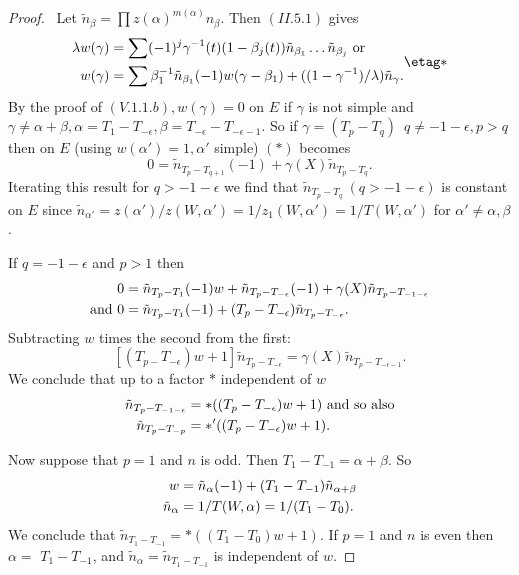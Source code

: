 \documentclass{memo-l}
\theoremstyle{definition}
\theoremstyle{remark}
\numberwithin{section}{chapter}
\numberwithin{equation}{chapter}
\begin{document}
\begin{proof} \ Let $\tilde n _{{\beta}}  = \prod 
z({\alpha})^{m({\alpha})}n_{{\beta}}$.  Then $(II.5.1)$ gives
$$
\aligned
{\lambda}w({\gamma})  &= 
\sum(-1)^{j}{\gamma}^{-1}(t)(1-{\beta}_{j}(t))\tilde n _{{\beta_1}}\ldots
\tilde n _{{\beta_j}}\ {\text{or}}\ \\
w({\gamma})  &= \sum{\beta}_{1}^{-1}\tilde n _{{\beta_1}}
(-1)w({\gamma}-{\beta}_{1}) + ((1-{\gamma}^{-1})/{\lambda})\tilde n_{{\gamma}} .
\endaligned  \etag *
$$
By the proof of $(V.1.1.b), w({\gamma})  =  0$ on $E$ if ${\gamma}$ is not
simple and ${\gamma} \ne  {\alpha}+{\beta}, {\alpha} = T_{1}-T_{-{\epsilon}},
{\beta} = T_{-{\epsilon}}-T_{-{\epsilon}-1}$.  So if ${\gamma}  = 
(T_{p}-T_{q})$\ $q \ne  -1-{\epsilon}, p > q$ then on $E$ (using $w({\alpha}')  = 
1, {\alpha}'$ simple) $(*)$ becomes
$$
0  =  \tilde n_{T_{p}-T_{q+1}}(-1) + {\gamma}(X)\tilde{n}_{T_{p}-T_{q}} .
$$
Iterating this result for $q > -1-{\epsilon}$ we find that 
$\tilde{n}_{T_{p}-T_{q}}\  (q > - 1 - {\epsilon})$ is constant on $E$ 
since $\tilde{n}_{{\alpha}'}  =  z({\alpha}')/z(W,{\alpha}')  =  
1/z_{1}(W,{\alpha}')  = 
1/T(W,{\alpha}')$ for ${\alpha}' \ne  {\alpha},{\beta}$.

   If $q  =  -1-{\epsilon}$ and $p > 1$ then
$$
\aligned
0 & =  \tilde{n}_{T_{p}-T_{1}} (-1)w + \tilde{n}_{T_{p}-T_{-{\epsilon}}}(-1) 
+ {\gamma}(X)\tilde{n}_{T_{p}-T_{-1-{\epsilon}}} \\
{\text{and}}\ 0  &=  \tilde{n}_{T_{p}-T_{1}}(-1) +
(T_{p}-T_{-{\epsilon}})\tilde{n}_{T_{p}-T_{-{\epsilon}}}.
\endaligned
$$
Subtracting $w$ times the second from the first:
$$
[(T_{p-}T_{-{\epsilon}})w+1]\tilde n_{T_{p}-T_{-{\epsilon}}} = 
{\gamma}(X)\tilde n_{T_{p}-T_{-{\epsilon}-1}}.
$$
We conclude that up to a factor $*$ independent of $w$
$$
\aligned
\tilde n_{T_{p}-T_{-1-{\epsilon}}}  &= 
*((T_{p}-T_{-{\epsilon}})w+1)\ {\text{and\ so\ also}} \\
\tilde n_{T_{p}-T_{-p}}  &=  *'((T_{p}-T_{-{\epsilon}})w+1).
\endaligned
$$

   Now suppose that $p = 1$ and $n$ is odd.  Then $T_{1}-T_{-1}  = 
{\alpha}+{\beta}$.  So
$$
\aligned
w  &=  \tilde n _{{\alpha}}(-1) + (T_{1}-T_{-1})\tilde n _{{\alpha}+{\beta}} \\
\tilde n _{{\alpha}}  &=  1/T(W,{\alpha})  =  1/(T_{1}-T_{0}).
\endaligned
$$
We conclude that $\tilde n_{T_{1}-T_{-1}}  =  *((T_{1}-T_{0})w+1)$.
If $p = 1$ and $n$ is even then ${\alpha}  = $ $T_{1}-T_{-1}$, and 
$\tilde n_{{\alpha}}  =  \tilde n_{T_{1}-T_{-1}}$ is independent of $w$.


\end{proof}
\end{document}
